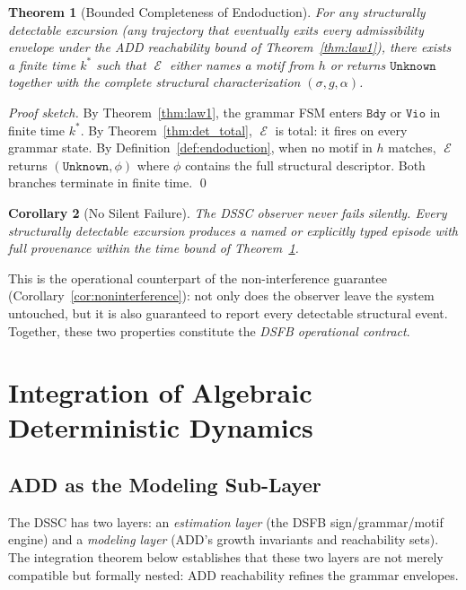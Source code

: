 \documentclass[11pt,a4paper]{article}
\theoremstyle{plain}
\newtheorem{theorem}{Theorem}[section]
\newtheorem{corollary}[theorem]{Corollary}
\theoremstyle{definition}
\theoremstyle{remark}
\DeclareMathOperator{\Endo}{\mathcal{E}}
\begin{document}
\begin{theorem}[Bounded Completeness of Endoduction]
\label{thm:completeness}
  For any structurally detectable excursion (any trajectory that eventually exits every
  admissibility envelope under the ADD reachability bound of Theorem~\ref{thm:law1}), there
  exists a finite time $k^*$ such that $\Endo$ either names a motif from $h$ or returns
  $\mathtt{Unknown}$ together with the complete structural characterization $(\sigma, g, \alpha)$.
\end{theorem}
\begin{proof}[Proof sketch]
  By Theorem~\ref{thm:law1}, the grammar FSM enters $\mathtt{Bdy}$ or $\mathtt{Vio}$ in finite
  time $k^*$. By Theorem~\ref{thm:det_total}, $\Endo$ is total: it fires on every grammar state.
  By Definition~\ref{def:endoduction}, when no motif in $h$ matches, $\Endo$ returns
  $(\mathtt{Unknown}, \phi)$ where $\phi$ contains the full structural descriptor. Both branches
  terminate in finite time. \qed
\end{proof}

\begin{corollary}[No Silent Failure]
\label{cor:no_silence}
  The DSSC observer never fails silently. Every structurally detectable excursion produces a
  named or explicitly typed episode with full provenance within the time bound of
  Theorem~\ref{thm:completeness}.
\end{corollary}

This is the operational counterpart of the non-interference guarantee
(Corollary~\ref{cor:noninterference}): not only does the observer leave the system untouched,
but it is also guaranteed to report every detectable structural event. Together, these two
properties constitute the \emph{DSFB operational contract}.

\section{Integration of Algebraic Deterministic Dynamics}
\label{sec:add_integration}

\subsection{ADD as the Modeling Sub-Layer}

The DSSC has two layers: an \emph{estimation layer} (the DSFB sign/grammar/motif engine) and a
\emph{modeling layer} (ADD's growth invariants and reachability sets). The integration theorem
below establishes that these two layers are not merely compatible but formally nested: ADD
reachability refines the grammar envelopes.
\end{document}
